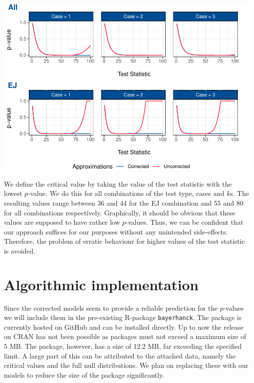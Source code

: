 \documentclass[12pt,a4paper]{article}
\let\origfigure\figure
\let\endorigfigure\endfigure
\renewenvironment{figure}[1][2] {
    \expandafter\origfigure\expandafter[H]
} {
    \endorigfigure
}
\begin{document}
\begin{figure}
\centering
\includegraphics{p_approx_paper_files/figure-latex/p_stat__k.2-1.pdf}
\caption{\label{fig:e_j_k.1} Simulated \(p\)-values plotted against
\(p\)-values approximated by final corrected models, exemplary for
\(k = 2\). Corrected (blue) and uncorrected (red) \(p\)-value
predictions for all cases and \(k = 2\), using EJ and All as underlying
tests.}
\end{figure}

We define the critical value by taking the value of the test statistic
with the lowest \(p\)-value. We do this for all combinations of the test
type, cases and \(k\)s. The resulting values range between 36 and 44 for
the EJ combination and 55 and 80 for all combinations respectively.
Graphically, it should be obvious that these values are supposed to have
rather low \(p\)-values. Thus, we can be confident that our approach
suffices for our purposes without any unintended side-effects.
Therefore, the problem of erratic behaviour for higher values of the
test statistic is avoided.

\hypertarget{algorithmic-implementation}{%
\section{Algorithmic implementation}\label{algorithmic-implementation}}

Since the corrected models seem to provide a reliable prediction for the
\(p\)-values we will include them in the pre-existing R-package
\texttt{bayerhanck}. The package is currently hosted on GitHub and can
be installed directly. Up to now the release on \ac{CRAN} has not been
possible as packages must not exceed a maximum size of 5 MB. The
package, however, has a size of 12.2 MB, far exceeding the specified
limit. A large part of this can be attributed to the attached data,
namely the critical values and the full null distributions. We plan on
replacing these with our models to reduce the size of the package
significantly.
\end{document}

